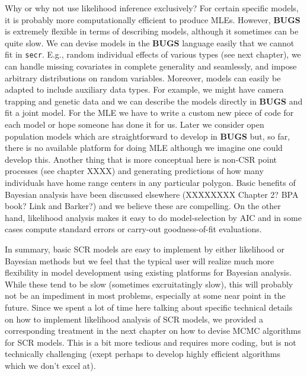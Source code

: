 Why or why not use likelihood inference exclusively? For certain
specific models, it is probably more computationally efficient to
produce MLEs. However, {\bf BUGS} is extremely flexible in terms of
describing models, although it sometimes can be quite slow. We can
devise models in the {\bf BUGS} language easily that we cannot fit in
\mbox{\tt secr}. E.g.,
random individual effects of various types (see next chapter), we can
handle missing covariates in complete generality and seamlessly, and
impose arbitrary distributions on random variables. Moreover, models
can easily be adapted to include auxiliary data types. For example, we
might have camera trapping and genetic data and we can describe the
models directly in {\bf BUGS} and fit a joint model. For the MLE we have
to write a custom new piece of code for each model or hope someone has
done it for us.  Later we consider open population models which are
straightforward to develop in {\bf BUGS} but, so far, there is no
available platform for doing MLE although we imagine one could develop
this.  Another thing that is more conceptual here is non-CSR point
processes (see chapter XXXX) and generating predictions of how many
individuals have home range centers in any particular polygon.  Basic
benefits of Bayesian analysis have been discussed elsewhere (XXXXXXXX Chapter
2? BPA book? Link and Barker?) and we believe these are compelling. On
the other hand, likelihood analysis makes it easy to do
model-selection by AIC and in some cases compute standard errors or
carry-out goodness-of-fit evaluations. 


In summary, basic SCR models are easy to implement by either
likelihood or Bayesian methods but we feel that the typical user will
realize much more flexibility in model development using existing
platforms for Bayesian analysis. While these tend to be slow
(sometimes excruitatingly slow), this will probably not be an
impediment in most problems, especially at some near point in the
future.  Since we spent a lot of time here talking about specific
technical details on how to implement likelihood analysis of SCR
models, we provided a corresponding treatment in the next chapter on
how to devise MCMC algorithms for SCR models. This is a bit more
tedious and requires more coding, but is not technically challenging
(exept perhaps to develop highly efficient algorithms which we don’t
excel at).



